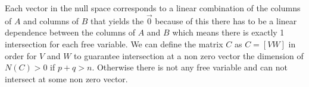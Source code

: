 			Each vector in the null space corresponds to a linear combination of the columns of $A$ and columns of $B$ that yields the $\vec{0}$ because of this there has to be a linear dependence between the columns of $A$ and $B$ which means there is exactly 1 intersection for each free variable.  We can define the matrix $C$ as $C=[VW]$ in order for $V$ and $W$ to guarantee intersection at a non zero vector the dimension of  $N(C) > 0$ if $p+q > n$. Otherwise there is not any free variable and can not intersect at some non zero vector.
